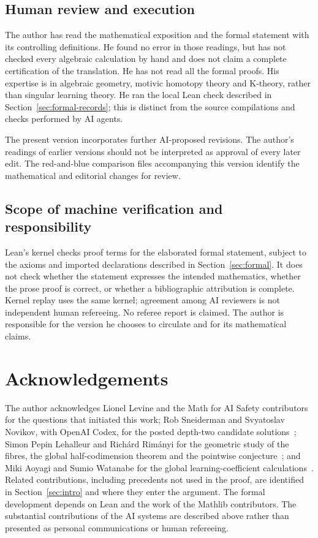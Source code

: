 \documentclass[11pt,a4paper]{article}
\theoremstyle{definition}
\theoremstyle{remark}
\numberwithin{equation}{section}
\begin{document}
\subsection*{Human review and execution}
The author has read the mathematical exposition and the formal statement with its controlling definitions. He found no error in those readings, but has not checked every algebraic calculation by hand and does not claim a complete certification of the translation. He has not read all the formal proofs. His expertise is in algebraic geometry, motivic homotopy theory and K-theory, rather than singular learning theory. He ran the local Lean check described in Section~\ref{sec:formal-records}; this is distinct from the source compilations and checks performed by AI agents.

The present version incorporates further AI-proposed revisions. The author's readings of earlier versions should not be interpreted as approval of every later edit. The red-and-blue comparison files accompanying this version identify the mathematical and editorial changes for review.

\subsection*{Scope of machine verification and responsibility}
Lean's kernel checks proof terms for the elaborated formal statement, subject to the axioms and imported declarations described in Section~\ref{sec:formal}. It does not check whether the statement expresses the intended mathematics, whether the prose proof is correct, or whether a bibliographic attribution is complete. Kernel replay uses the same kernel; agreement among AI reviewers is not independent human refereeing. No referee report is claimed. The author is responsible for the version he chooses to circulate and for its mathematical claims.

\section*{Acknowledgements}
The author acknowledges Lionel Levine and the Math for AI Safety contributors for the questions that initiated this work; Rob Sneiderman and Svyatoslav Novikov, with OpenAI Codex, for the posted depth-two candidate solutions~\cite{mais-issue-3,mais-issue-12}; Simon Pepin Lehalleur and Richárd Rimányi for the geometric study of the fibres, the global half-codimension theorem and the pointwise conjecture~\cite{lehalleur-rimanyi}; and Miki Aoyagi and Sumio Watanabe for the global learning-coefficient calculations~\cite{aoyagi-watanabe,aoyagi-2024}. Related contributions, including precedents not used in the proof, are identified in Section~\ref{sec:intro} and where they enter the argument. The formal development depends on Lean and the work of the Mathlib contributors. The substantial contributions of the AI systems are described above rather than presented as personal communications or human refereeing.
\appendix
\end{document}
